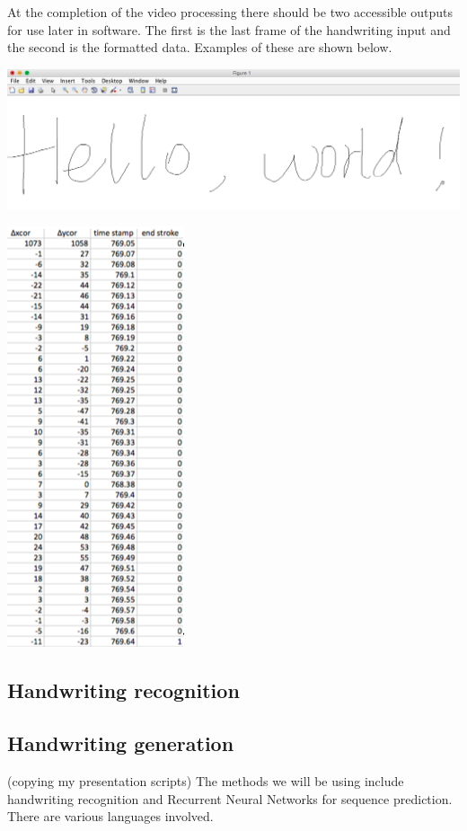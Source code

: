\documentclass{article} %
\begin{document}
At the completion of the video processing there should be two accessible outputs for use later in software. The first is the last frame of the handwriting input and the second is the formatted data. Examples of these are shown below.
\begin{center}
\includegraphics[scale = 0.2]{Hello_world.png}
\end{center}
\begin{center}
\includegraphics[scale = 0.7]{Collected_Data.png}
\end{center}


\subsection{Handwriting recognition}
\subsection{Handwriting generation}
(copying my presentation scripts)
The methods we will be using include handwriting recognition and Recurrent Neural Networks for sequence prediction. There are various languages involved. 
\end{document}
